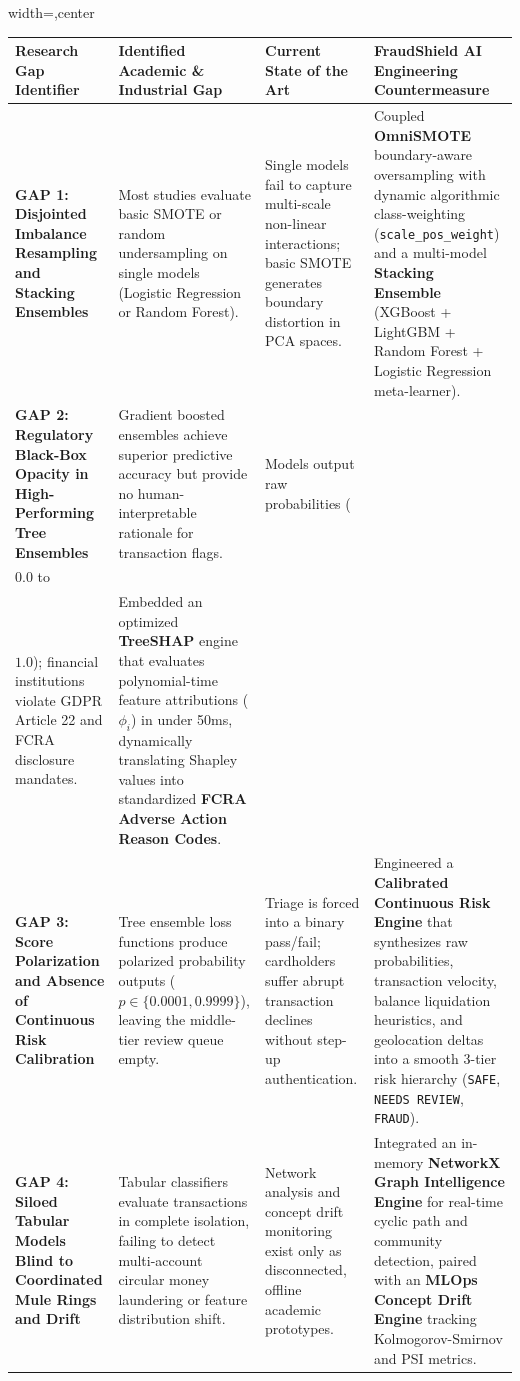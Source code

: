 \documentclass[12pt,a4paper,oneside]{report}
\begin{document}
\begin{table}[H]
\centering
\footnotesize
\begin{adjustbox}{width=\textwidth,center}
\begin{tabular}{| l | l | l | l |}
\hline
\rowcolor{tableheader} \textbf{Research Gap Identifier} & \textbf{Identified Academic \& Industrial Gap} & \textbf{Current State of the Art} & \textbf{FraudShield AI Engineering Countermeasure} \\ \hline
\textbf{GAP 1: Disjointed Imbalance Resampling and Stacking Ensembles} & Most studies evaluate basic SMOTE or random undersampling on single models (Logistic Regression or Random Forest). & Single models fail to capture multi-scale non-linear interactions; basic SMOTE generates boundary distortion in PCA spaces. & Coupled \textbf{OmniSMOTE} boundary-aware oversampling with dynamic algorithmic class-weighting (\texttt{scale\_pos\_weight}) and a multi-model \textbf{Stacking Ensemble} (XGBoost + LightGBM + Random Forest + Logistic Regression meta-learner). \\ \hline
\rowcolor{tablealt} \textbf{GAP 2: Regulatory Black-Box Opacity in High-Performing Tree Ensembles} & Gradient boosted ensembles achieve superior predictive accuracy but provide no human-interpretable rationale for transaction flags. & Models output raw probabilities (\\$0.0$ to \\$1.0$); financial institutions violate GDPR Article 22 and FCRA disclosure mandates. & Embedded an optimized \textbf{TreeSHAP} engine that evaluates polynomial-time feature attributions ($\phi_i$) in under 50ms, dynamically translating Shapley values into standardized \textbf{FCRA Adverse Action Reason Codes}. \\ \hline
\textbf{GAP 3: Score Polarization and Absence of Continuous Risk Calibration} & Tree ensemble loss functions produce polarized probability outputs ($p \in \{0.0001, 0.9999\}$), leaving the middle-tier review queue empty. & Triage is forced into a binary pass/fail; cardholders suffer abrupt transaction declines without step-up authentication. & Engineered a \textbf{Calibrated Continuous Risk Engine} that synthesizes raw probabilities, transaction velocity, balance liquidation heuristics, and geolocation deltas into a smooth 3-tier risk hierarchy (\texttt{SAFE}, \texttt{NEEDS REVIEW}, \texttt{FRAUD}). \\ \hline
\rowcolor{tablealt} \textbf{GAP 4: Siloed Tabular Models Blind to Coordinated Mule Rings and Drift} & Tabular classifiers evaluate transactions in complete isolation, failing to detect multi-account circular money laundering or feature distribution shift. & Network analysis and concept drift monitoring exist only as disconnected, offline academic prototypes. & Integrated an in-memory \textbf{NetworkX Graph Intelligence Engine} for real-time cyclic path and community detection, paired with an \textbf{MLOps Concept Drift Engine} tracking Kolmogorov-Smirnov and PSI metrics. \\ \hline
\end{tabular}
\end{adjustbox}
\end{table}
\end{document}
